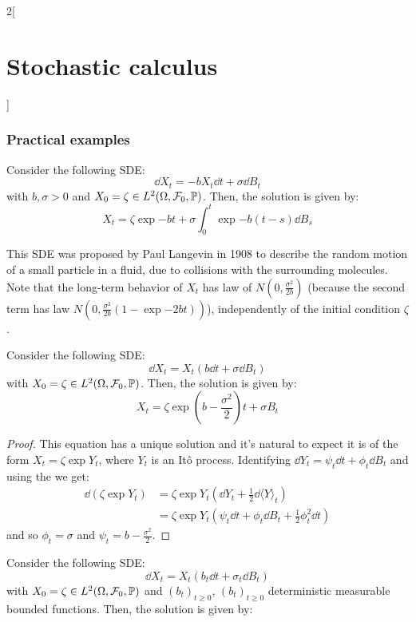 \documentclass[../../../main_math.tex]{subfiles}
\begin{document}
\begin{multicols}{2}[\section{Stochastic calculus}]
  \subsubsection{Practical examples}
  \begin{proposition}
    Consider the following SDE:
    $$
      \dd{X_t}=-b X_t\dd{t}+\sigma\dd{B_t}
    $$ with $b,\sigma>0$ and $X_0=\zeta\in L^2(\Omega,\mathcal{F}_0,\mathbb{P})$. Then, the solution is given by:
    $$
      X_t= \zeta \exp{-bt}+\sigma\int_0^t \exp{-b(t-s)}\dd{B_s}
    $$
  \end{proposition}
  \begin{remark}
    This SDE was proposed by Paul Langevin in 1908 to describe the random motion of a small particle in a fluid, due to collisions with the surrounding molecules. Note that the long-term behavior of $X_t$ has law of $N(0,\frac{\sigma^2}{2b})$ (because the second term has law $N(0,\frac{\sigma^2}{2b}(1-\exp{-2bt}))$), independently of the initial condition $\zeta$.
  \end{remark}
  \begin{proposition}
    Consider the following SDE:
    $$
      \dd{X_t}=X_t(b \dd{t}+\sigma\dd{B_t})
    $$
    with $X_0=\zeta\in L^2(\Omega,\mathcal{F}_0,\mathbb{P})$. Then, the solution is given by:
    $$
      X_t=\zeta\exp{\left(b-\frac{\sigma^2}{2}\right) t+\sigma B_t}
    $$
  \end{proposition}
  \begin{proof}
    This equation has a unique solution and it's natural to expect it is of the form $X_t=\zeta \exp{Y_t}$, where $Y_t$ is an Itô process. Identifying $\dd{Y_t}=\psi_t\dd{t}+\phi_t\dd{B_t}$ and using the  we get:
    \begin{align*}
      \dd{(\zeta \exp{Y_t})} & =\zeta \exp{Y_t}\left(\dd{Y_t}+\frac{1}{2}\dd{{\langle Y\rangle}_t}\right)         \\
                             & =\zeta \exp{Y_t}\left(\psi_t\dd{t}+\phi_t\dd{B_t}+\frac{1}{2}\phi_t^2\dd{t}\right)
    \end{align*}
    and so $\phi_t=\sigma$ and $\psi_t=b-\frac{\sigma^2}{2}$.
  \end{proof}
  \begin{proposition}
    Consider the following SDE:
    $$
      \dd{X_t}=X_t(b_t \dd{t}+\sigma_t\dd{B_t})
    $$
    with $X_0=\zeta\in L^2(\Omega,\mathcal{F}_0,\mathbb{P})$ and ${(b_t)}_{t\geq 0}$, ${(b_t)}_{t\geq 0}$ deterministic measurable bounded functions. Then, the solution is given by:

\end{proposition}
\end{multicols}
\end{document}
